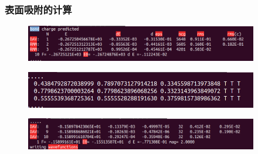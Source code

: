 \frame
{
	\frametitle{表面吸附的计算}
	{\fontsize{7.2pt}{5.2pt}\selectfont{结构弛豫后的基态能量}}
\begin{figure}[h!]
\centering
\vskip -5pt
\includegraphics[width=4.0in,viewport=0 0 940 127,clip]{Figures/Pt_surface-adsorption-nohup.png}
\caption{\fontsize{6.2pt}{5.2pt}}%
\label{Pt_surface-adsorption-nohup}
\end{figure}
{\fontsize{7.2pt}{5.2pt}}%
\begin{figure}[h!]
\centering
\vskip -5pt
\includegraphics[width=4.0in,viewport=0 0 650 95,clip]{Figures/Pt_surface-adsorption-CONTCAR.png}
\caption{\fontsize{6.2pt}{5.2pt}}%
\label{Pt_surface-adsorption-CONTCAR}
\end{figure}
{\fontsize{7.2pt}{5.2pt}}%
\begin{figure}[h!]
\centering
\vskip -5pt
\includegraphics[width=4.0in,viewport=0 0 940 120,clip]{Figures/O_adsorption-OSZICAR.png}
\caption{\fontsize{6.2pt}{5.2pt}}%
\label{O_adsorption-OSZICAR}
\end{figure}
}

